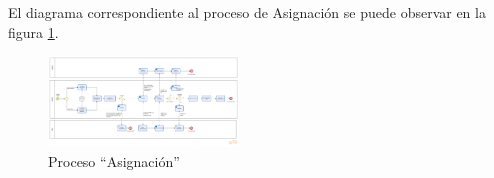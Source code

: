             El diagrama correspondiente al proceso de Asignación se puede observar en la figura \ref{ProcesoAsignacion}.

            \begin{figure}[H]
                \begin{center}
                    \includegraphics[angle=90, width=0.45\textwidth]{marcoTeorico/imagenes/Proceso-Asignacion.png}
                    \caption{Proceso ``Asignación''}
                    \label{ProcesoAsignacion}
                \end{center}
            \end{figure}











